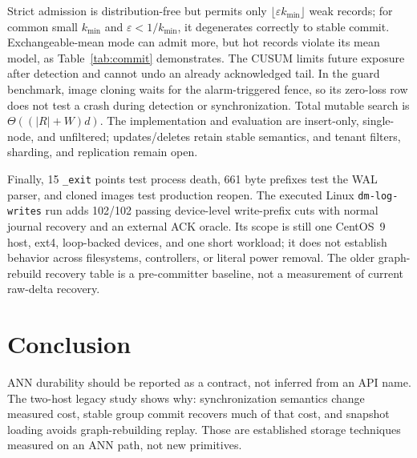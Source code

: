 \documentclass[sigconf,nonacm,balance=false]{acmart}
\begin{document}
Strict admission is distribution-free but permits only
$\lfloor\varepsilon k_{\min}\rfloor$ weak records; for common small $k_{\min}$ and
$\varepsilon<1/k_{\min}$, it degenerates correctly to stable commit. Exchangeable-mean mode
can admit more, but hot records violate its mean model, as Table~\ref{tab:commit}
demonstrates. The CUSUM limits future exposure after detection and cannot undo an
already acknowledged tail. In the guard benchmark, image cloning waits for the
alarm-triggered fence, so its zero-loss row does not test a crash during detection
or synchronization. Total mutable search is
$\Theta((|R|+W)d)$. The implementation and evaluation are insert-only,
single-node, and unfiltered; updates/deletes retain stable semantics, and tenant
filters, sharding, and replication remain open.

Finally, 15 \texttt{\_exit} points test process death, 661 byte prefixes test the
WAL parser, and cloned images test production reopen. The executed Linux
\texttt{dm-log-writes} run adds 102/102 passing device-level write-prefix cuts
with normal journal recovery and an external ACK oracle. Its scope is still one
CentOS~9 host, ext4, loop-backed devices, and one short workload; it does not
establish behavior across filesystems, controllers, or literal power removal.
The older graph-rebuild recovery table is a pre-committer baseline, not a
measurement of current raw-delta recovery.

\section{Conclusion}
ANN durability should be reported as a contract, not inferred from an API name.
The two-host legacy study shows why: synchronization semantics change measured
cost, stable group commit recovers much of that cost, and snapshot loading avoids
graph-rebuilding replay. Those are established storage techniques measured on an
ANN path, not new primitives.
\end{document}
